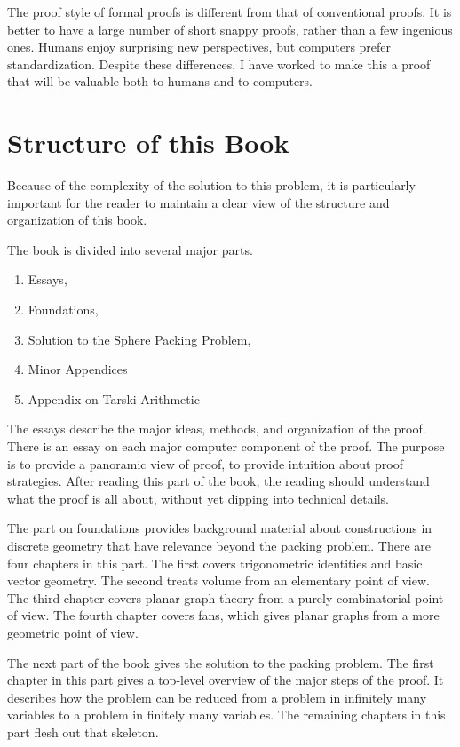 The proof style of formal proofs is different from that of
conventional proofs.  It is better to have a large number of short
snappy proofs, rather than a few ingenious ones.  Humans enjoy
surprising new perspectives, but computers prefer standardization.
Despite these differences, I have worked to make this a proof that
will be valuable both to humans and to computers.


\section{Structure of this Book}

Because of the complexity of the solution to this problem, it is particularly important for the reader to maintain a clear view of the structure and organization of this book. 

The book is divided into several major parts.
\begin{enumerate}
\item Essays,
\item Foundations,
\item Solution to the Sphere Packing Problem,
\item Minor Appendices
\item Appendix on Tarski Arithmetic
\end{enumerate}
The essays describe the major ideas,  methods, and organization of the proof.  There is an essay on each major computer component of the proof. The purpose is to provide a panoramic view of proof, to provide intuition about proof strategies.  After reading this part of the book, the reading should understand what the proof is all about, without yet dipping into technical details.  

The part on foundations provides background material about constructions in discrete geometry that have relevance beyond the packing problem.  There are four chapters in this part.  The first covers trigonometric identities and basic vector geometry.  The second treats volume from an elementary point of view.  The third chapter covers planar graph theory from a purely combinatorial point of view.  The fourth chapter covers fans, which gives planar graphs from a more geometric point of view.

The next part of the book gives the solution to the packing problem.  The first chapter in this part gives a top-level overview of the major steps of the proof.  It describes how the problem can be reduced from a problem in infinitely many variables to a problem in finitely many variables.  The remaining chapters in this part flesh out that skeleton.

